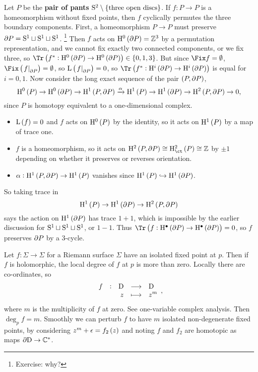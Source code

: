 \begin{example*}
Let $ P $ be the \textbf{pair of pants} $ \S^2 \setminus \cbr{\text{three open discs}} $. If $ f : P \to P $ is a homeomorphism without fixed points, then $ f $ cyclically permutes the three boundary components. First, a homeomorphism $ P \to P $ must preserve $ \da P = \S^1 \sqcup \S^1 \sqcup \S^1 $. \footnote{Exercise: why?} Then $ f $ acts on $ \H^0\br{\da P} = \ZZ^3 $ by a permutation representation, and we cannot fix exactly two connected components, or we fix three, so $ \Tr \br{f^* : \H^0\br{\da P} \to \H^0\br{\da P}} \in \cbr{0, 1, 3} $. But since $ \Fix f = \emptyset $, $ \Fix \br{\eval{f}_{\da P}} = \emptyset $, so $ \L\br{\eval{f}_{\da P}} = 0 $, so $ \Tr \br{f^* : \H^i\br{\da P} \to \H^i\br{\da P}} $ is equal for $ i = 0, 1 $. Now consider the long exact sequence of the pair $ \br{P, \da P} $,
$$ \H^0\br{P} \to \H^0\br{\da P} \to \H^1\br{P, \da P} \xrightarrow{\alpha} \H^1\br{P} \to \H^1\br{\da P} \to \H^2\br{P, \da P} \to 0, $$
since $ P $ is homotopy equivalent to a one-dimensional complex.
\begin{itemize}
\item $ \L\br{f} = 0 $ and $ f $ acts on $ \H^0\br{P} $ by the identity, so it acts on $ \H^1\br{P} $ by a map of trace one.
\item $ f $ is a homeomorphism, so it acts on $ \H^2\br{P, \da P} \cong \Hc^2\br{P} \cong \ZZ $ by $ \pm 1 $ depending on whether it preserves or reverses orientation.
\item $ \alpha : \H^1\br{P, \da P} \to \H^1\br{P} $ vanishes since $ \H^1\br{P} \hookrightarrow \H^1\br{\da P} $.
\end{itemize}
So taking trace in
$$ \H^1\br{P} \to \H^1\br{\da P} \to \H^2\br{P, \da P} $$
says the action on $ \H^1\br{\da P} $ has trace $ 1 + 1 $, which is impossible by the earlier discussion for $ \S^1 \sqcup \S^1 \sqcup \S^1 $, or $ 1 - 1 $. Thus $ \Tr \br{f : \H^\bullet\br{\da P} \to \H^\bullet\br{\da P}} = 0 $, so $ f $ preserves $ \da P $ by a $ 3 $-cycle.
\end{example*}

\pagebreak

\begin{example*}
Let $ f : \Sigma \to \Sigma $ for a Riemann surface $ \Sigma $ have an isolated fixed point at $ p $. Then if $ f $ is holomorphic, the local degree of $ f $ at $ p $ is more than zero. Locally there are co-ordinates, so
$$ \function[f]{\D}{\D}{z}{z^m}, $$
where $ m $ is the multiplicity of $ f $ at zero. See one-variable complex analysis. Then $ \deg_p f = m $. Smoothly we can perturb $ f $ to have $ m $ isolated non-degenerate fixed points, by considering $ z^m + \epsilon = f_2\br{z} $ and noting $ f $ and $ f_2 $ are homotopic as maps $ \da\D \to \CC^* $.
\end{example*}

